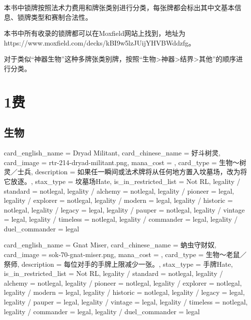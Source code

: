 \documentclass[lang = cn, color = black, 10pt]{AllThatStax}
\begin{document}
本书中锁牌按照法术力费用和牌张类别进行分类，每张牌都会标出其中文基本信息、锁牌类型和赛制合法性。

本书中所有收录的锁牌都可以在Moxfield网站上找到，地址为https://www.moxfield.com/decks/kBI9w5lzJUijYHVBWddzfg。

对于类似“神器生物”这种多牌张类别牌，按照“生物>神器>结界>其他”的顺序进行分类。

\tableofcontents

\mainmatter


\chapter{1费}

\section{生物}

\card
{
	card_english_name = {Dryad Militant},
	card_chinese_name = {好斗树灵},
	card_image = rtr-214-dryad-militant.png,
	mana_cost = ,
	card_type = 生物～树灵／士兵,
	description = {如果任一瞬间或法术牌将从任何地方置入坟墓场，改为将它放逐。},
	stax_type = 坟墓场Hate,
	is_in_restricted_list = Not RL,
	legality / standard = notlegal,
	legality / alchemy = notlegal,
	legality / pioneer = legal,
	legality / explorer = notlegal,
	legality / modern = legal,
	legality / historic = notlegal,
	legality / legacy = legal,
	legality / pauper = notlegal,
	legality / vintage = legal,
	legality / timeless = notlegal,
	legality / commander = legal,
	legality / duel_commander = legal
}

\card
{
	card_english_name = {Gnat Miser},
	card_chinese_name = {蚋虫守财奴},
	card_image = sok-70-gnat-miser.png,
	mana_cost = ,
	card_type = 生物～老鼠／祭师,
	description = {每位对手的手牌上限减少一张。},
	stax_type = 手牌Hate,
	is_in_restricted_list = Not RL,
	legality / standard = notlegal,
	legality / alchemy = notlegal,
	legality / pioneer = notlegal,
	legality / explorer = notlegal,
	legality / modern = legal,
	legality / historic = notlegal,
	legality / legacy = legal,
	legality / pauper = legal,
	legality / vintage = legal,
	legality / timeless = notlegal,
	legality / commander = legal,
	legality / duel_commander = legal
}
\end{document}
